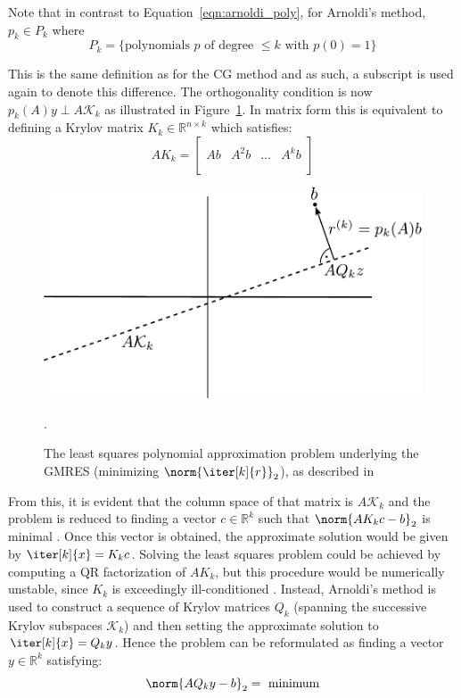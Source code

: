 \noindent Note that in contrast to Equation~\hyperref[eqn:arnoldi_poly]{\ref{eqn:arnoldi_poly}}, for Arnoldi's method, $p_k \in P_k$ where
\begin{equation}
    P_k = \{\text{polynomials } p \text{ of degree } \leq k \text{ with }p(0)=1\}
\end{equation}

\noindent This is the same definition as for the CG method and as such, a subscript is used again to denote this difference. The orthogonality condition is now $p_k(A)y \perp A\mathcal{K}_k$ as illustrated in Figure~\hyperref[fig:gmres]{\ref{fig:gmres}}. In matrix form this is equivalent to defining a Krylov matrix $K_k \in \mathbb{R}^{n \times k}$ which satisfies:
\begin{equation}
\label{eqn:krylov_matrix}
  AK_k =
  \left[
    \begin{array}{c|c|c|c}
      & & & \\
      Ab & A^2b & \dots & A^kb \\
      & & & \\
    \end{array}
  \right] 
\end{equation}

\begin{figure}[h]
    \centering
    \includegraphics[width=0.7\linewidth]{chapters/3_solvers/3_2_iterative_solvers/figures/GMRES.pdf}
    \caption{The least squares polynomial approximation problem underlying the GMRES (minimizing $\norm{\iter[k]{r}}_2$), as described in \cite{trefethen_numerical_1997}}.
    \label{fig:gmres}
\end{figure}

\noindent From this, it is evident that the column space of that matrix is $A\mathcal{K}_k$ and the problem is reduced to finding a vector $c \in \mathbb{R}^{k}$ such that $\norm{AK_kc-b}_2$ is minimal   \cite{trefethen_numerical_1997}. Once this vector is obtained, the approximate solution would be given by $\iter[k]{x} =K_kc$. Solving the least squares problem could be achieved by computing a QR factorization of $AK_k$, but this procedure would be numerically unstable, since $K_k$ is exceedingly ill-conditioned \cite{trefethen_numerical_1997}. Instead, Arnoldi's method is used to construct a sequence of Krylov matrices $Q_k$ (spanning the successive Krylov subspaces $\mathcal{K}_k$) and then setting the approximate solution to $\iter[k]{x} = Q_ky$. Hence the problem can be reformulated as finding a vector $y \in \mathbb{R}^k$ satisfying:
\begin{equation}
    \norm{AQ_ky-b}_2=\text{ minimum}
\end{equation}


